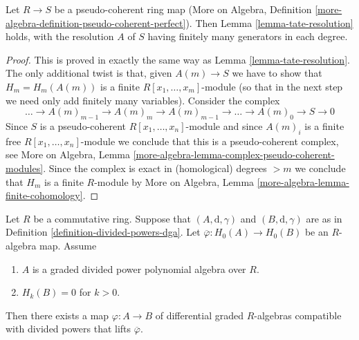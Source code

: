 \begin{lemma}
\label{lemma-tate-resoluton-pseudo-coherent-ring-map}
Let $R \to S$ be a pseudo-coherent ring map (More on Algebra, Definition
\ref{more-algebra-definition-pseudo-coherent-perfect}). Then
Lemma \ref{lemma-tate-resolution} holds, with the resolution $A$ of $S$
having finitely many generators in each degree.
\end{lemma}

\begin{proof}
This is proved in exactly the same way as Lemma \ref{lemma-tate-resolution}.
The only additional twist is that, given $A(m) \to S$ we have to
show that $H_m = H_m(A(m))$ is a finite $R[x_1, \ldots, x_m]$-module
(so that in the next step we need only add finitely many variables).
Consider the complex
$$
\ldots \to A(m)_{m - 1} \to A(m)_m \to A(m)_{m - 1} \to
\ldots \to A(m)_0 \to S \to 0
$$
Since $S$ is a pseudo-coherent $R[x_1, \ldots, x_n]$-module
and since $A(m)_i$ is a finite free $R[x_1, \ldots, x_n]$-module
we conclude that this is a pseudo-coherent complex, see
More on Algebra, Lemma \ref{more-algebra-lemma-complex-pseudo-coherent-modules}.
Since the complex is exact in (homological) degrees $> m$
we conclude that $H_m$ is a finite $R$-module by
More on Algebra, Lemma \ref{more-algebra-lemma-finite-cohomology}.
\end{proof}

\begin{lemma}
\label{lemma-uniqueness-tate-resolution}
Let $R$ be a commutative ring. Suppose that $(A, \text{d}, \gamma)$ and
$(B, \text{d}, \gamma)$ are as in
Definition \ref{definition-divided-powers-dga}.
Let $\overline{\varphi} : H_0(A) \to H_0(B)$ be an $R$-algebra map.
Assume
\begin{enumerate}
\item $A$ is a graded divided power polynomial algebra over $R$.
\item $H_k(B) = 0$ for $k > 0$.
\end{enumerate}
Then there exists a map $\varphi : A \to B$ of differential
graded $R$-algebras compatible with divided powers
that lifts $\overline{\varphi}$.
\end{lemma}

